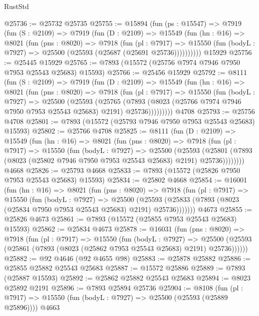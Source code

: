 \begin{lexlean}{RustStd}
\begin{coremodule}
@25736 := @25732 @25735
@25755 := @15894
    (fun (ps : @15547) =>
    @7919
      (fun (S : @2109) =>
      @7919
        (fun (D : @2109) =>
        @15549
          (fun (hn : @16) =>
          @8021
            (fun (pns : @8020) =>
            @7918
              (fun (pl : @7917) =>
              @15550 (fun (bodyL : @7927) => @25500 (@25593 (@25687 (@25691 @25736))))))))))
    @15929
@25756 := @25445 @15929
@25765 := @7893 (@15572 (@25756 @7974 @7946 @7950 @7953 @25543 @25683) @15593)
@25766 := @25456 @15929
@25792 := @8111
    (fun (S : @2109) =>
    @7919
      (fun (D : @2109) =>
      @15549
        (fun (hn : @16) =>
        @8021
          (fun (pns : @8020) =>
          @7918
            (fun (pl : @7917) =>
            @15550
              (fun (bodyL : @7927) =>
              @25500
                (@25593
                  (@25765
                    (@7893
                      (@8023 (@25766 @7974 @7946 @7950 @7953 @25543 @25683) @2191)
                      @25736)))))))))
    @4708
@25793 := @25756 @4708
@25801 := @7893 (@15572 (@25793 @7946 @7950 @7953 @25543 @25683) @15593)
@25802 := @25766 @4708
@25825 := @8111
    (fun (D : @2109) =>
    @15549
      (fun (hn : @16) =>
      @8021
        (fun (pns : @8020) =>
        @7918
          (fun (pl : @7917) =>
          @15550
            (fun (bodyL : @7927) =>
            @25500
              (@25593
                (@25801 (@7893 (@8023 (@25802 @7946 @7950 @7953 @25543 @25683) @2191) @25736))))))))
    @4668
@25826 := @25793 @4668
@25833 := @7893 (@15572 (@25826 @7950 @7953 @25543 @25683) @15593)
@25834 := @25802 @4668
@25854 := @16001
    (fun (hn : @16) =>
    @8021
      (fun (pns : @8020) =>
      @7918
        (fun (pl : @7917) =>
        @15550
          (fun (bodyL : @7927) =>
          @25500
            (@25593 (@25833 (@7893 (@8023 (@25834 @7950 @7953 @25543 @25683) @2191) @25736)))))))
    @4673
@25855 := @25826 @4673
@25861 := @7893 (@15572 (@25855 @7953 @25543 @25683) @15593)
@25862 := @25834 @4673
@25878 := @16031
    (fun (pns : @8020) =>
    @7918
      (fun (pl : @7917) =>
      @15550
        (fun (bodyL : @7927) =>
        @25500 (@25593 (@25861 (@7893 (@8023 (@25862 @7953 @25543 @25683) @2191) @25736))))))
@25882 := @92 @4646 (@92 @4655 @98)
@25883 := @25878 @25882
@25886 := @25855 @25882 @25543 @25683
@25887 := @15572 @25886
@25889 := @7893 (@25887 @15593)
@25892 := @25862 @25882 @25543 @25683
@25894 := @8023 @25892 @2191
@25896 := @7893 @25894 @25736
@25904 := @8108
    (fun (pl : @7917) => @15550 (fun (bodyL : @7927) => @25500 (@25593 (@25889 @25896))))
    @4663

\end{coremodule}
\end{lexlean}
